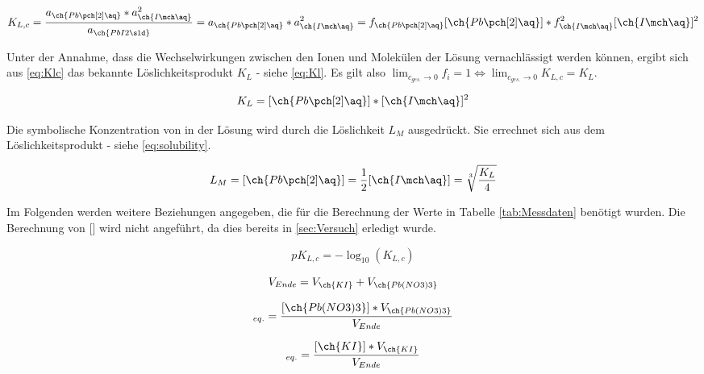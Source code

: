 \documentclass{article}
\begin{document}
      \begin{equation}
        K_{L,c} = \frac{a_{\ch{Pb\pch[2]\aq}} * a_{\ch{I\mch\aq}}^2}{a_{\ch{PbI2\sld}}} = a_{\ch{Pb\pch[2]\aq}} * a_{\ch{I\mch\aq}}^2 = f_{\ch{Pb\pch[2]\aq}} [\ch{Pb\pch[2]\aq}] * f_{\ch{I\mch\aq}}^2 [\ch{I\mch\aq}]^2 \label{eq:Klc}
      \end{equation} 
      
      Unter der Annahme, dass die Wechselwirkungen zwischen den Ionen und Molekülen der Lösung vernachlässigt werden können, ergibt sich aus \eqref{eq:Klc} das bekannte Löslichkeitsprodukt $K_{L}$ - siehe \eqref{eq:Kl}. Es gilt also $\lim_{c_{ges.}\to 0} f_{i} = 1 \Leftrightarrow \lim_{c_{ges.}\to 0} K_{L,c} = K_{L}$.
      
      \begin{equation}
        K_{L} = [\ch{Pb\pch[2]\aq}] * [\ch{I\mch\aq}]^2 \label{eq:Kl}
      \end{equation} 
      
      Die symbolische Konzentration von  in der Lösung wird durch die Löslichkeit $L_{M}$ ausgedrückt. Sie errechnet sich aus dem Löslichkeitsprodukt - siehe \eqref{eq:solubility}.
      
      \begin{equation}
        L_{M} = [\ch{Pb\pch[2]\aq}] = \frac{1}{2} [\ch{I\mch\aq}] = \sqrt[3]{\frac{K_{L}}{4}} \label{eq:solubility}
      \end{equation} 
      
      Im Folgenden werden weitere Beziehungen angegeben, die für die Berechnung der Werte in Tabelle \ref{tab:Messdaten} benötigt wurden. Die Berechnung von [] wird nicht angeführt, da dies bereits in \ref{sec:Versuch} erledigt wurde.
      
      \begin{equation}
        pK_{L,c} = -\log_{10} (K_{L,c})
      \end{equation}
      
      \begin{equation}
        V_{Ende} = V_{\ch{KI}} + V_{\ch{Pb(NO3)3}}
      \end{equation}
      
      \begin{equation}
        [\ch{Pb\pch[2]\aq}]_{eq.} = \frac{[\ch{Pb(NO3)3}] * V_{\ch{Pb(NO3)3}}}{V_{Ende}}
      \end{equation}
      
      \begin{equation}
        [\ch{I\mch\aq}]_{eq.} = \frac{[\ch{KI}] * V_{\ch{KI}}}{V_{Ende}}
      \end{equation}
      
\end{document}
